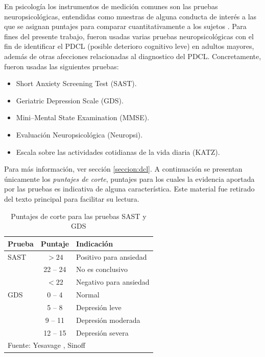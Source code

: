 \documentclass[12pt,letterpaper]{book}
\begin{document}
En psicología los instrumentos de medición comunes son las pruebas neuropsicológicas, entendidas como muestras de alguna conducta de interés a las que se asignan puntajes para comparar cuantitativamente a los sujetos \cite{Ardila12}. 
%
%
Para fines del presente trabajo, fueron usadas varias pruebas neuropsicológicas con el fin de identificar el PDCL (posible deterioro cognitivo leve) en adultos mayores, además de otras afecciones relacionadas al diagnostico del PDCL.
%
Concretamente, fueron usadas las siguientes pruebas:
\begin{itemize}
\item {Short Anxiety Screening Test (SAST)}. 
\item {Geriatric Depression Scale (GDS)}.
\item {Mini--Mental State Examination (MMSE)}.
\item {Evaluación Neuropsicológica (Neuropsi)}.
\item {Escala sobre las actividades cotidianas de la vida diaria (KATZ)}.
\end{itemize}

Para más información, ver sección \ref{seccion:dcl}.
%
A continuación se presentan únicamente los \textit{puntajes de corte}, puntajes para los cuales la evidencia aportada por las pruebas es indicativa de alguna característica.
%
Este material fue retirado del texto principal para facilitar su lectura.

\begin{table}
\centering
\caption{Puntajes de corte para las pruebas SAST y GDS}
\begin{tabular}{lcl}
\toprule
Prueba & Puntaje & Indicación \\
\midrule
SAST
& $>24$ & Positivo para ansiedad \\
& 22 -- 24 & No es conclusivo \\
& $<22$ & Negativo para ansiedad \\
\midrule
GDS
& 0 -- 4 & Normal \\
& 5 -- 8 & Depresión leve \\
& 9 -- 11 & Depresión moderada \\
& 12 -- 15 & Depresión severa \\
\bottomrule
\multicolumn{3}{l}{Fuente: Yesavage \cite{Yesavage82}, Sinoff \cite{sinoff99} }
\end{tabular}
\label{anexo:sast_gds}
\end{table}
\end{document}
